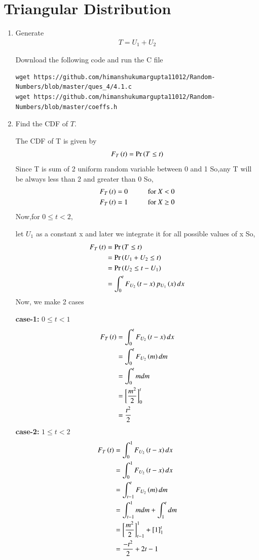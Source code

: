 \documentclass[journal,12pt,twocolumn]{IEEEtran}
\renewcommand\thesection{\arabic{section}}
\begin{document}
	\section{Triangular Distribution}
	\begin{enumerate}[label=\thesection.\arabic*
		,ref=\thesection.\theenumi]
		\item Generate 
		\begin{align}
			T = U_1+U_2
		\end{align}
		
		\solution Download the following code and run the C file
		\begin{lstlisting}
wget https://github.com/himanshukumargupta11012/Random-Numbers/blob/master/ques_4/4.1.c
wget https://github.com/himanshukumargupta11012/Random-Numbers/blob/master/coeffs.h	
		\end{lstlisting}
		\item Find the CDF of $T$.
		
		\solution
		The CDF of T is given by
		\begin{align}
			F_T\left(t\right)=\Pr\left(T\leq t\right)
		\end{align}
		Since T is sum of 2 uniform random variable between 0 and 1 
		So,any T will be always less than 2 and greater than 0
		So,
		\begin{align}
			F_T\brak{t}=0 \hspace{10mm} \text{for $X<0$}\\
			F_T\brak{t}=1 \hspace{10mm} \text{for $X\geq0$}
		\end{align}
		Now,for $0\leq t<2$,
		
		let $U_1$ as a constant x and later we integrate it for all possible values of x
		So,
		\begin{align}
			F_T\left(t\right)&=\Pr\left(T\leq t\right)\\
			&=\Pr\left(U_1+U_2\leq t\right)\\
			&=\Pr\left(U_2\leq t-U_1\right)\\
			&=\int_0^t F_{U_2}\left(t-x\right) p_{U_1}\left(x\right)dx
		\end{align}
		Now, we make 2 cases
		
		
		\textbf{case-1:} $0\leq t<1$
		\begin{align}
			F_T\left(t\right)&=\int_0^t F_{U_2}\left(t-x\right)dx\\
			&=\int_0^t F_{U_2}\left(m\right)dm\\
			&=\int_0^t mdm\\
			&=\bigg[\frac{m^2}{2}\bigg]_0^t\\
			&=\frac{t^2}{2}
		\end{align}
		\textbf{case-2:} $1\leq t<2$
		\begin{align}
			F_T\left(t\right)&=\int_0^1 F_{U_2}\left(t-x\right)dx\\
			&=\int_0^1 F_{U_2}\left(t-x\right)dx\\
			&=\int_{t-1}^t F_{U_2}\left(m\right)dm\\
			&=\int_{t-1}^1 mdm+\int_1^t dm\\
			&=\bigg[\frac{m^2}{2}\bigg]_{t-1}^1+[1]_1^t\\
			&=\frac{-t^2}{2}+2t-1	
		\end{align}
		

\end{enumerate}
\end{document}
